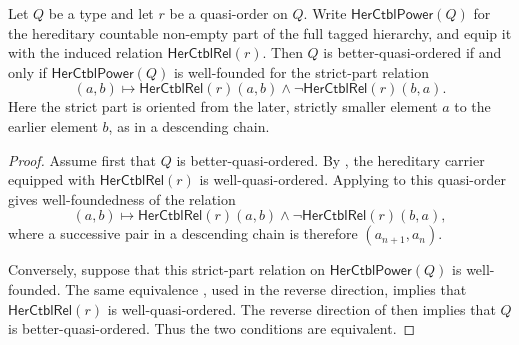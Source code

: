 \begin{theorem}
Let $Q$ be a type and let $r$ be a quasi-order on $Q$.  Write
$\mathsf{HerCtblPower}(Q)$ for the hereditary countable non-empty part of
the full tagged hierarchy, and equip it with the induced relation
$\mathsf{HerCtblRel}(r)$.  Then $Q$ is better-quasi-ordered if and only if
$\mathsf{HerCtblPower}(Q)$ is well-founded for the strict-part relation
\[
(a,b)\longmapsto
\mathsf{HerCtblRel}(r)(a,b)\mathbin{\wedge}
\neg\mathsf{HerCtblRel}(r)(b,a).
\]
Here the strict part is oriented from the later, strictly smaller element
$a$ to the earlier element $b$, as in a descending chain.
\end{theorem}
\begin{proof}
Assume first that $Q$ is better-quasi-ordered.  By
, the hereditary carrier equipped with
$\mathsf{HerCtblRel}(r)$ is well-quasi-ordered.  Applying
 to this quasi-order gives well-foundedness
of the relation
\[
(a,b)\longmapsto
\mathsf{HerCtblRel}(r)(a,b)\mathbin{\wedge}
\neg\mathsf{HerCtblRel}(r)(b,a),
\]
where a successive pair in a descending chain is therefore
$(a_{n+1},a_n)$.

Conversely, suppose that this strict-part relation on
$\mathsf{HerCtblPower}(Q)$ is well-founded.  The same equivalence
, used in the reverse direction, implies
that $\mathsf{HerCtblRel}(r)$ is well-quasi-ordered.  The reverse direction
of  then implies that $Q$ is better-quasi-ordered.
Thus the two conditions are equivalent.
\end{proof}
